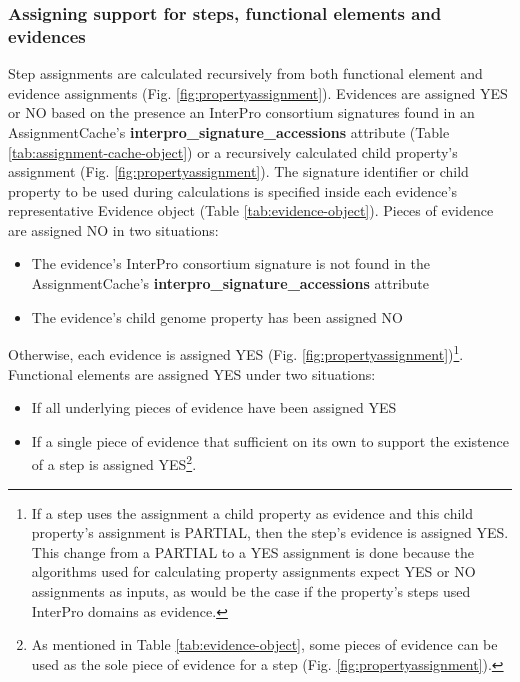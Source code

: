 \subsubsection{Assigning support for steps, functional elements and evidences}

Step assignments are calculated recursively from both functional element and 
evidence assignments (Fig. \ref{fig:propertyassignment}). Evidences are assigned 
YES or NO based on the presence an InterPro consortium signatures found in an 
AssignmentCache's \textbf{interpro\_signature\_accessions} attribute (Table 
\ref{tab:assignment-cache-object}) or a recursively calculated child property's 
assignment (Fig. \ref{fig:propertyassignment}). The signature identifier or 
child property to be used during calculations is specified inside each 
evidence's representative Evidence object (Table \ref{tab:evidence-object}). 
Pieces of evidence are assigned NO in two situations: 

\FloatBarrier
\begin{itemize}
\item The evidence's InterPro consortium signature is not found in the 
AssignmentCache's \textbf{interpro\_signature\_accessions} attribute 
\item The evidence's child genome property has been assigned NO 
\end{itemize}

Otherwise, each evidence is assigned YES (Fig. 
\ref{fig:propertyassignment})\footnote{If a step uses the assignment a child 
property as evidence and this child property's assignment is PARTIAL, then the 
step's evidence is assigned YES. This change from a PARTIAL to a YES assignment 
is done because the algorithms used for calculating property assignments expect 
YES or NO assignments as inputs, as would be the case if the property's steps 
used InterPro domains as evidence.}. Functional elements are assigned YES under 
two situations: 

\FloatBarrier
\begin{itemize}
\item If all underlying pieces of evidence have been assigned YES
\item If a single piece of evidence that sufficient on its own to support the 
existence of a step is assigned YES\footnote{As mentioned in Table 
\ref{tab:evidence-object}, some pieces of evidence can be used as the sole piece 
of evidence for a step (Fig. \ref{fig:propertyassignment}).}.
\end{itemize}

